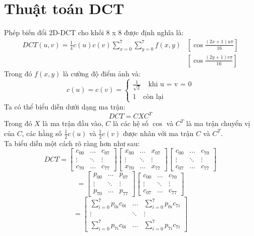 \documentclass[conference]{IEEEtran}
\begin{document}
	\section{Thuật toán DCT}
	Phép biến đổi 2D-DCT cho khối 8 x 8 được định nghĩa là:
	\begin{align*}
	DCT(u,v) = \frac{1}{4}c(u)c(v)\sum_{x = 0}^{7}\sum_{y = 0}^{7}f(x, y)&[\cos\frac{(2x + 1)u\pi}{16}]\\
	&[\cos\frac{(2y + 1)v\pi}{16}]
	\end{align*}
	Trong đó $f(x, y)$ là cường độ điểm ảnh và:
	\[
	c(u) = c(v) = \begin{cases*}
	\frac{1}{\sqrt{2}} \quad \text{khi u = v = 0}\\
	1 \quad \text{còn lại}
	\end{cases*}
	\]
	Ta có thể biểu diễn dưới dạng ma trận:
	\begin{equation*}
	DCT = C X C^T
	\end{equation*}
	Trong đó $X$ là ma trận đầu vào, $C$ là các hệ số $\cos$ và $C^T$ là ma trận chuyển vị của $C$, các hằng số $\frac{1}{2}c(u)$ và $\frac{1}{2}c(v)$ được nhân với ma trận $C$ và $C^T$.\\
	Ta biểu diễn một cách rõ ràng hơn như sau:
	\[DCT = 
	\begin{bmatrix}
	c_{00} &\dots &c_{07}\\
	\vdots &\ddots &\vdots\\
	c_{70} &\dots &c_{77}
	\end{bmatrix}
	\begin{bmatrix}
	x_{00} &\dots &x_{07}\\
	\vdots &\ddots &\vdots\\
	x_{70} &\dots &x_{77}
	\end{bmatrix}
	\begin{bmatrix}
	c_{00} &\dots &c_{70}\\
	\vdots &\ddots &\vdots\\
	c_{07} &\dots &c_{77}
	\end{bmatrix}		
	\]
	\[=
	\begin{bmatrix}
	p_{00} &\dots &p_{07}\\
	\vdots &\ddots &\vdots\\
	p_{70} &\dots &p_{77}
	\end{bmatrix}
	\begin{bmatrix}
	c_{00} &\dots &c_{70}\\
	\vdots &\ddots &\vdots\\
	c_{07} &\dots &c_{77}
	\end{bmatrix}
	\]
	\[=
	\begin{bmatrix}
	\sum_{i=0}^{7}p_{0i}c_{0i} &\dots &\sum_{i=0}^{7}p_{0i}c_{7i}\\
	\vdots &\ddots &\vdots\\
	\sum_{i=0}^{7}p_{7i}c_{0i} &\dots &\sum_{i=0}^{7}p_{7i}c_{7i}
	\end{bmatrix}
	\]
\end{document}
